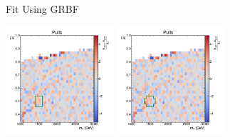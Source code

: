 \documentclass[10pt]{beamer}
\begin{document}
\begin{frame}{Fit Using GRBF}
  \begin{center}
    \includegraphics[width=0.3\textwidth]{figures/2dpullplots/grbf/E_1500_0p5_100_0p05.pdf} 
    \includegraphics[width=0.3\textwidth]{figures/2dpullplots/grbf/E_1500_0p5_150_0p05.pdf} 
  \end{center}


\end{frame}
\end{document}
